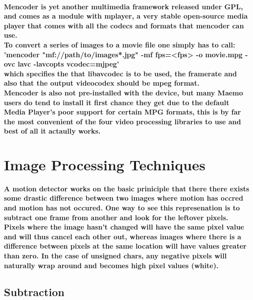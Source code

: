 \documentclass[11pt]{article} %
\begin{document}
\paragraph{Mencoder is yet another multimedia framework released under GPL, and comes as a module with mplayer, a very stable open-source media player that comes with all the codecs and formats that mencoder can use.\\
To convert a series of images to a movie file one simply has to call:\\
'mencoder "mf://path/to/images*.jpg" -mf fps=<fps> -o movie.mpg -ovc lavc -lavcopts vcodec=mjpeg'\\
which specifies the that libavcodec is to be used, the framerate and also that the output videocodex should be mpeg format.
\\Mencoder is also not pre-installed with the device, but many Maemo users do tend to install it first chance they get due to the default Media Player's poor support for certain MPG formats, this is by far the most convenient of the four video processing libraries to use and best of all it actaully works.
}
\section{Image Processing Techniques}
\paragraph{A motion detector works on the basic priniciple that there there exists some drastic difference between two images where motion has occred and motion has not occured. One way to see this represenation is to subtract one frame from another and look for the leftover pixels. Pixels where the image hasn't changed will have the same pixel value and will thus cancel each other out, whereas images where there is a difference between pixels at the same location will have values greater than zero. In the case of unsigned chars, any negative pixels will naturally wrap around and becomes high pixel values (white).}
\subsection{Subtraction}
\end{document}
